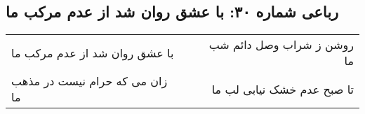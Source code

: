 \begin{center}
\section*{رباعی شماره ۳۰: با عشق روان شد از عدم مرکب ما}
\label{sec:0030}
\begin{longtable}{l p{0.5cm} r}
با عشق روان شد از عدم مرکب ما
&&
روشن ز شراب وصل دائم شب ما
\\
زان می که حرام نیست در مذهب ما
&&
تا صبح عدم خشک نیابی لب ما
\\
\end{longtable}
\end{center}
